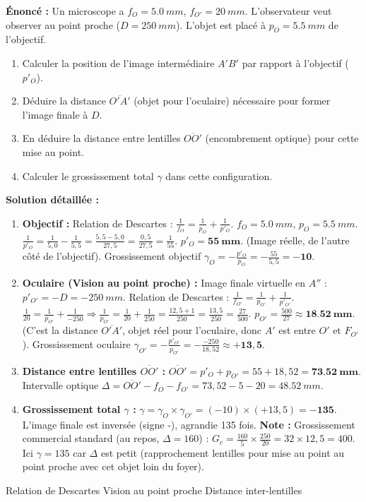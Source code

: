\documentclass[11pt]{article}
\newcommand{\cle}[1]{{\popxbold\color{popdark}#1}}
\begin{document}
\begin{exoresolu}
\textbf{Énoncé :} Un microscope a $f_O = \SI{5,0}{mm}$, $f_{O'} = \SI{20}{mm}$. L'observateur veut observer au point proche ($D = \SI{250}{mm}$). L'objet est placé à $p_O = \SI{5,5}{mm}$ de l'objectif.
\begin{enumerate}
    \item Calculer la position de l'image intermédiaire $A'B'$ par rapport à l'objectif ($p'_O$).
    \item Déduire la distance $\overline{O'A'}$ (objet pour l'oculaire) nécessaire pour former l'image finale à $D$.
    \item En déduire la distance entre lentilles $\overline{OO'}$ (encombrement optique) pour cette mise au point.
    \item Calculer le grossissement total $\gamma$ dans cette configuration.
\end{enumerate}

\tcblower
\textbf{Solution détaillée :}
\begin{enumerate}
    \item \textbf{Objectif :} Relation de Descartes : $\frac{1}{f_O} = \frac{1}{p_O} + \frac{1}{p'_O}$.
    $f_O = \SI{5,0}{mm}$, $p_O = \SI{5,5}{mm}$.
    $\frac{1}{p'_O} = \frac{1}{5,0} - \frac{1}{5,5} = \frac{5,5 - 5,0}{27,5} = \frac{0,5}{27,5} = \frac{1}{55}$.
    $p'_O = \mathbf{\SI{55}{mm}}$. (Image réelle, de l'autre côté de l'objectif).
    Grossissement objectif $\gamma_O = -\frac{p'_O}{p_O} = -\frac{55}{5,5} = \mathbf{-10}$.
    \item \textbf{Oculaire (Vision au point proche) :} Image finale virtuelle en $A''$ : $p'_{O'} = -D = -\SI{250}{mm}$.
    Relation de Descartes : $\frac{1}{f_{O'}} = \frac{1}{p_{O'}} + \frac{1}{p'_{O'}}$.
    $\frac{1}{20} = \frac{1}{p_{O'}} + \frac{1}{-250} \Rightarrow \frac{1}{p_{O'}} = \frac{1}{20} + \frac{1}{250} = \frac{12,5 + 1}{250} = \frac{13,5}{250} = \frac{27}{500}$.
    $p_{O'} = \frac{500}{27} \approx \mathbf{\SI{18,52}{mm}}$.
    (C'est la distance $\overline{O'A'}$, objet réel pour l'oculaire, donc $A'$ est entre $O'$ et $F_{O'}$).
    Grossissement oculaire $\gamma_{O'} = -\frac{p'_{O'}}{p_{O'}} = -\frac{-250}{18,52} \approx \mathbf{+13,5}$.
    \item \textbf{Distance entre lentilles $\overline{OO'}$ :}
    $\overline{OO'} = p'_O + p_{O'} = 55 + 18,52 = \mathbf{\SI{73,52}{mm}}$.
    Intervalle optique $\Delta = \overline{OO'} - f_O - f_{O'} = 73,52 - 5 - 20 = \SI{48,52}{mm}$.
    \item \textbf{Grossissement total $\gamma$ :} $\gamma = \gamma_O \times \gamma_{O'} = (-10) \times (+13,5) = \mathbf{-135}$.
    L'image finale est inversée (signe -), agrandie 135 fois.
    \textbf{Note :} Grossissement commercial standard (au repos, $\Delta=160$) : $G_c = \frac{160}{5} \times \frac{250}{20} = 32 \times 12,5 = 400$. Ici $\gamma=135$ car $\Delta$ est petit (rapprochement lentilles pour mise au point au point proche avec cet objet loin du foyer).
\end{enumerate}
\cle{Relation de Descartes} \cle{Vision au point proche} \cle{Distance inter-lentilles}
\end{exoresolu}
\end{document}
